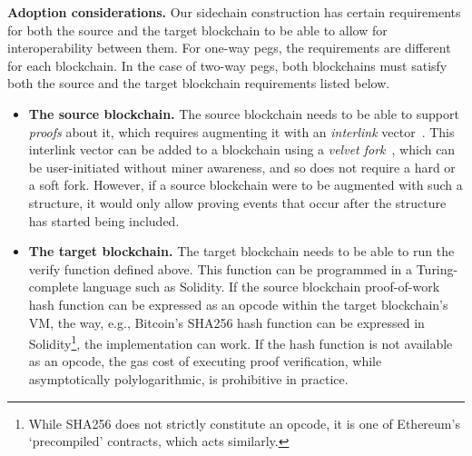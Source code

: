 \noindent
\textbf{Adoption considerations. } Our sidechain construction has certain
requirements for both the source and the target blockchain to be able to allow
for interoperability between them. For one-way pegs, the requirements are
different for each blockchain. In the case of two-way pegs, both blockchains
must satisfy both the source and the target blockchain requirements listed
below.

\begin{itemize}
  \item \textbf{The source blockchain. } The source blockchain needs to be able
        to support \emph{proofs} about it, which requires augmenting it with an
        \emph{interlink} vector~\cite{popow}. This interlink vector can be added
        to a blockchain using a \emph{velvet fork}~\cite{nipopows,velvet}, which
        can be user-initiated without miner awareness, and so does not require a
        hard or a soft fork. However, if a source blockchain were to be
        augmented with such a structure, it would only allow proving events that
        occur after the structure has started being included.
  \item \textbf{The target blockchain. } The target blockchain needs to be able
        to run the \textsf{verify} function defined above. This function can be
        programmed in a Turing-complete language such as Solidity. If the source
        blockchain proof-of-work hash function can be expressed as an opcode
        within the target blockchain's VM, the way, e.g., Bitcoin's SHA256 hash
        function can be expressed in Solidity\footnote{While SHA256 does not
        strictly constitute an opcode, it is one of Ethereum's `precompiled'
        contracts, which acts similarly.}, the implementation can work. If the
        hash function is not available as an opcode, the gas cost of executing
        proof verification, while asymptotically polylogarithmic, is prohibitive
        in practice.
\end{itemize}

